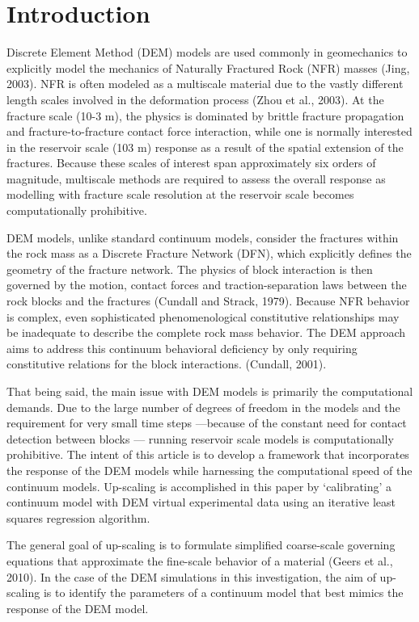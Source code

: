 \section{Introduction}
Discrete Element Method (DEM) models are used commonly in geomechanics to explicitly model the mechanics of Naturally Fractured Rock (NFR) masses (Jing, 2003). NFR is often modeled as a multiscale material due to the vastly different length scales involved in the deformation process (Zhou et al., 2003). At the fracture scale (10-3 m), the physics is dominated by brittle fracture propagation and fracture-to-fracture contact force interaction, while one is normally interested in the reservoir scale (103 m) response as a result of the spatial extension of the fractures. Because these scales of interest span approximately six orders of magnitude, multiscale methods are required to assess the overall response as modelling with fracture scale resolution at the reservoir scale becomes computationally prohibitive. 

DEM models, unlike standard continuum models, consider the fractures within the rock mass as a Discrete Fracture Network (DFN), which explicitly defines the geometry of the fracture network. The physics of block interaction is then governed by the motion, contact forces and traction-separation laws between the rock blocks and the fractures (Cundall and Strack, 1979). Because NFR behavior is complex, even sophisticated phenomenological constitutive relationships may be inadequate to describe the complete rock mass behavior. The DEM approach aims to address this continuum behavioral deficiency by only requiring constitutive relations for the block interactions. (Cundall, 2001).

That being said, the main issue with DEM models is primarily the computational demands. Due to the large number of degrees of freedom in the models and the requirement for very small time steps —because of the constant need for contact detection between blocks — running reservoir scale models is computationally prohibitive. The intent of this article is to develop a framework that incorporates the response of the DEM models while harnessing the computational speed of the continuum models. Up-scaling is accomplished in this paper by ‘calibrating’ a continuum model with DEM virtual experimental data using an iterative least squares regression algorithm.

The general goal of up-scaling is to formulate simplified coarse-scale governing equations that approximate the fine-scale behavior of a material (Geers et al., 2010). In the case of the DEM simulations in this investigation, the aim of up-scaling is to identify the parameters of a continuum model that best mimics the response of the DEM model.


